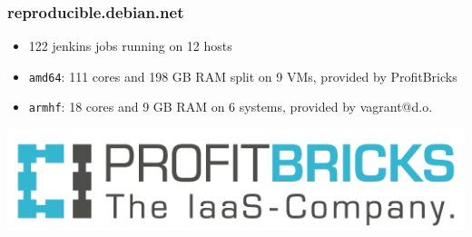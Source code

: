 \documentclass[14pt,aspectratio=169]{beamer}
\begin{document}
\begin{frame}
 \frametitle{reproducible.debian.net}
 \begin{itemize}
  \item 122 jenkins jobs running on 12 hosts
  \item \texttt{amd64}: 111 cores and 198 GB RAM split on 9 VMs, provided by
  ProfitBricks
  \item \texttt{armhf}: 18 cores and 9 GB RAM on 6 systems, provided by vagrant@d.o.
 \end{itemize}
 \begin{center}
  \includegraphics[height=0.2\paperheight]{images/profitbricks_logo.png}
  \vfill
 \end{center}
\end{frame}
\end{document}
